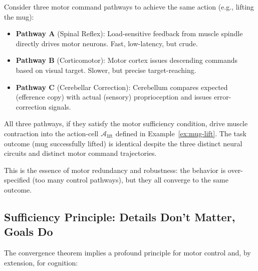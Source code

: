 \begin{corollary}
\label{cor:multiple-pathways}
Consider three motor command pathways to achieve the same action (e.g., lifting the mug):

\begin{itemize}[noitemsep]
\item \textbf{Pathway A} (Spinal Reflex): Load-sensitive feedback from muscle spindle directly drives motor neurons. Fast, low-latency, but crude.
\item \textbf{Pathway B} (Corticomotor): Motor cortex issues descending commands based on visual target. Slower, but precise target-reaching.
\item \textbf{Pathway C} (Cerebellar Correction): Cerebellum compares expected (efference copy) with actual (sensory) proprioception and issues error-correction signals.
\end{itemize}

All three pathways, if they satisfy the motor sufficiency condition, drive muscle contraction into the action-cell $\mathcal{A}_{\text{lift}}$ defined in Example~\ref{ex:mug-lift}. The task outcome (mug successfully lifted) is identical despite the three distinct neural circuits and distinct motor command trajectories.

This is the essence of motor redundancy and robustness: the behavior is over-specified (too many control pathways), but they all converge to the same outcome.
\end{corollary}

\subsection{Sufficiency Principle: Details Don't Matter, Goals Do}
\label{subsec:sufficiency-principle}

The convergence theorem implies a profound principle for motor control and, by extension, for cognition:

